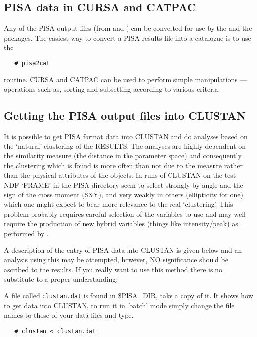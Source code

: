 \subsection{PISA data in CURSA and CATPAC}

Any of the PISA output files (from  and
) can be converted for use by the  and the  packages.
The easiest way to convert a PISA results file into a catalogue is to
use the
\begin{verbatim}
   # pisa2cat
\end{verbatim}
routine. CURSA and CATPAC can be used to perform simple manipulations
--- operations such as, sorting and subsetting according to various
criteria.

\subsection{Getting the PISA output files into CLUSTAN}

It is possible to get PISA format data into CLUSTAN and do analyses
based on the `natural' clustering of the RESULTS.
The analyses are highly dependent on the similarity measure (the
distance in the parameter space) and consequently the clustering which
is found is more often than not due to the measure rather than the
physical attributes of the objects.
In runs of CLUSTAN on the test NDF `FRAME' in the PISA directory seem
to select strongly by angle and the sign of the cross moment (SXY),
and very weakly in others (ellipticity for one) which one might expect
to bear more relevance to the real `clustering'.
This problem probably requires careful selection of the variables to
use and may well require the production of new hybrid variables
(things like intensity/peak) as performed by .

A description of the entry of PISA data into CLUSTAN is given below and an
analysis using this may be attempted, however, NO significance  should be
ascribed to the results. If you really want to use this method there is no
substitute to a proper understanding.

A file called \verb+clustan.dat+ is found in \$PISA\_DIR, take a copy
of it. It shows how to get data into CLUSTAN, to run it in `batch'
mode simply change the file names to those of your 
data files and type.
\begin{verbatim}
   # clustan < clustan.dat
\end{verbatim}

